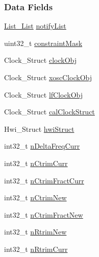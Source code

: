 \subsubsection*{Data Fields}
\begin{DoxyCompactItemize}
\item 
\hyperlink{struct_list___list}{List\+\_\+\+List} \hyperlink{struct_power_c_c26_x_x___module_state_ab7a30da55e342a00e49baab649ad1fc0}{notify\+List}
\item 
uint32\+\_\+t \hyperlink{struct_power_c_c26_x_x___module_state_ad500e504e794086911ecad33c3134f37}{constraint\+Mask}
\item 
Clock\+\_\+\+Struct \hyperlink{struct_power_c_c26_x_x___module_state_a9a7e3273e7717d152d90816efded773e}{clock\+Obj}
\item 
Clock\+\_\+\+Struct \hyperlink{struct_power_c_c26_x_x___module_state_a390c88b1cf057a96455b0b0e2d0c1b9f}{xosc\+Clock\+Obj}
\item 
Clock\+\_\+\+Struct \hyperlink{struct_power_c_c26_x_x___module_state_ac692ad2a24589c37d4c2e5918a9b29ec}{lf\+Clock\+Obj}
\item 
Clock\+\_\+\+Struct \hyperlink{struct_power_c_c26_x_x___module_state_a3b3efe9eda8024f9c8eb1abb05acb8e3}{cal\+Clock\+Struct}
\item 
Hwi\+\_\+\+Struct \hyperlink{struct_power_c_c26_x_x___module_state_a234289c39d94951e2950b425d152c140}{hwi\+Struct}
\item 
int32\+\_\+t \hyperlink{struct_power_c_c26_x_x___module_state_aa85213d5686bba5b7b214207deb27637}{n\+Delta\+Freq\+Curr}
\item 
int32\+\_\+t \hyperlink{struct_power_c_c26_x_x___module_state_a964421fa101fbf783bcaf061380614ef}{n\+Ctrim\+Curr}
\item 
int32\+\_\+t \hyperlink{struct_power_c_c26_x_x___module_state_afa3ea38f50ef03b11159820b2ea40385}{n\+Ctrim\+Fract\+Curr}
\item 
int32\+\_\+t \hyperlink{struct_power_c_c26_x_x___module_state_a88f64a21ba0bf629a4a053acc7437b4d}{n\+Ctrim\+New}
\item 
int32\+\_\+t \hyperlink{struct_power_c_c26_x_x___module_state_ae73577d0ac8b0e0ac6066a51da2e2069}{n\+Ctrim\+Fract\+New}
\item 
int32\+\_\+t \hyperlink{struct_power_c_c26_x_x___module_state_a72a304c2f61537e3419cf94ae9428dcc}{n\+Rtrim\+New}
\item 
int32\+\_\+t \hyperlink{struct_power_c_c26_x_x___module_state_a71ecdf485b5ac83bda9f50683912cf80}{n\+Rtrim\+Curr}
\item 

\end{DoxyCompactItemize}
